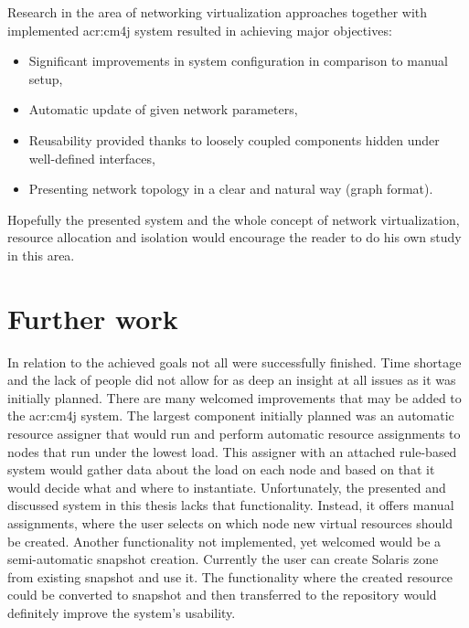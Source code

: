 \documentclass[11pt,openany]{book}
\begin{document}
      Research in the area of networking virtualization approaches together with implemented \gls{acr:cm4j} system
      resulted in achieving major objectives:

      \begin{itemize}
        \item Significant improvements in system configuration in comparison to manual setup,
        \item Automatic update of given network parameters,
        \item Reusability provided thanks to loosely coupled components hidden under well-defined interfaces,
        \item Presenting network topology in a clear and natural way (graph format).
      \end{itemize}
		
      Hopefully the presented system and the whole concept of network virtualization, resource allocation and isolation
      would encourage the reader to do his own study in this area.
		

    \section{Further work}
		\label{sub:sum:further}
	
      In relation to the achieved goals not all were successfully finished. Time shortage and the lack of people did not
      allow for as deep an insight at all issues as it was initially planned. There are many welcomed improvements that
      may be added to the \gls{acr:cm4j} system. The largest component initially planned was an automatic resource
      assigner that would run and perform automatic resource assignments to nodes that run under the lowest load. This
      assigner with an attached rule-based system would gather data about the load on each node and based on that it
      would decide what and where to instantiate. Unfortunately, the presented and discussed system in this thesis lacks
      that functionality. Instead, it offers manual assignments, where the user selects on which node new virtual
      resources should be created. Another functionality not implemented, yet welcomed would be a semi-automatic
      snapshot creation. Currently the user can create Solaris zone from existing snapshot and use it. The functionality
      where the created resource could be converted to snapshot and then transferred to the repository would definitely
      improve the system's usability. 


  \printglossaries

  
  
\end{document}

